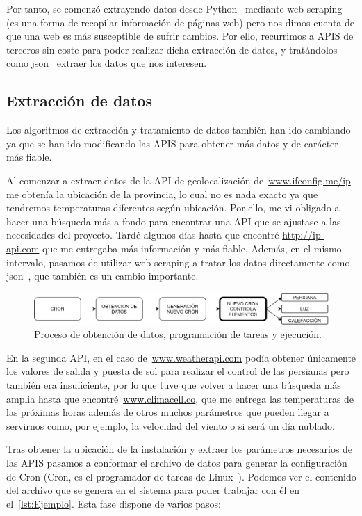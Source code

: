 Por tanto, se comenzó extrayendo datos desde Python~\cite{misc:Python} mediante web scraping (es una forma de recopilar información de páginas web) pero nos dimos cuenta de que una web es más susceptible de sufrir cambios. Por ello, recurrimos a APIS de terceros sin coste para poder realizar dicha extracción de datos, y tratándolos como json~\cite{misc:Json} extraer los datos que nos interesen.

\subsection{Extracción de datos}
Los algoritmos de extracción y tratamiento de datos también han ido cambiando ya que se han ido modificando las APIS para obtener más datos y de carácter más fiable.

Al comenzar a extraer datos de la API de geolocalización de~\url{www.ifconfig.me/ip} me obtenía la ubicación de la provincia, lo cual no es nada exacto ya que tendremos temperaturas diferentes según ubicación. Por ello, me vi obligado a hacer una búsqueda más a fondo para encontrar una API que se ajustase a las necesidades del proyecto. Tardé algunos días hasta que encontré \url{http://ip-api.com} que me entregaba más información y más fiable. Además, en el mismo intervalo, pasamos de utilizar web scraping a tratar los datos directamente como json~\cite{misc:Json}, que también es un cambio importante.

\begin{figure}
    \centering
    \includegraphics[width=\textwidth]{img/Cron1.PNG}
    \caption{Proceso de obtención de datos, programación de tareas y ejecución.} \label{Img:Cron1}
\end{figure}

En la segunda API, en el caso de~\url{www.weatherapi.com} podía obtener únicamente los valores de salida y puesta de sol para realizar el control de las persianas pero también era insuficiente, por lo que tuve que volver a hacer una búsqueda más amplia hasta que encontré~\url{www.climacell.co}, que me entrega las temperaturas de las próximas horas además de otros muchos parámetros que pueden llegar a servirnos como, por ejemplo, la velocidad del viento o si será un día nublado.

Tras obtener la ubicación de la instalación y extraer los parámetros necesarios de las APIS pasamos a conformar el archivo de datos para generar la configuración de Cron (Cron, es el programador de tareas de Linux~\cite{misc:Linux}). Podemos ver el contenido del archivo que se genera en el sistema para poder trabajar con él en el~\ref{lst:Ejemplo}. Esta fase dispone de varios pasos:

